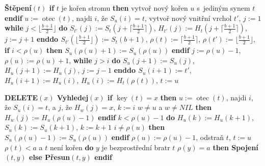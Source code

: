 \documentclass[a4paper,12pt]{article}
\DeclareMathOperator*{\otec}{otec}
\DeclareMathOperator*{\key}{key}
\begin{document}
{\bf Štěpení$(t)$\newline 
if} $t$ je kořen stromu {\bf then}\newline 
\phantom{---}vytvoř nový kořen $u$ s~jediným synem $t$\newline 
{\bf endif}\newline 
$u:=\otec(t)$, najdi $i$, že $S_u(i)=t$,\newline 
vytvoř nový vnitřní vrchol $t'$, $j:=1$\newline 
{\bf while} $j<\lfloor\frac {b+1}2\rfloor$ {\bf do}\newline 
\phantom{---}$S_{t'}(j):=S_t(j+\lceil\frac {b+1}2\rceil )$, $H_{t'}(j):=H_t(j+\lceil\frac {b+1}2\rceil)$, $j:=j+1$\newline 
{\bf enddo\newline 
$S_{t'}(\lfloor\frac {b+1}2\rfloor ):=S_t(b+1)$}, $\rho (t):=\lceil\frac {
b+1}2\rceil$, $\rho (t'):=\lfloor\frac {b+1}2\rfloor$,\newline 
{\bf if} $i<\rho (u)$ {\bf then} $S_u(\rho (u)+1):=S_u(\rho (u))$ {\bf endif\newline}
$j:=\rho (u)-1$, $\rho (u):=\rho (u)+1$,\newline 
{\bf while} $j>i$ {\bf do}\newline 
\phantom{---}$S_u(j+1):=S_u(j)$, $H_u(j+1):=H_u(j)$, $j:=j-1$\newline 
{\bf enddo\newline 
$S_u(i+1):=t'$}, $H_u(i+1):=H_u(i)$, $H_u(i):=H_t(\rho (t))$, 
$t:=u$

{\bf DELETE$(x)$\newline 
Vyhledej$(x)$\newline 
if} $\key(t)=x$ {\bf then}\newline 
\phantom{---}$u:=\otec(t)$, najdi $i$, že $S_u(i)=t$, a $j$, že $H_w(j)=x$, $k:=i$\newline 
\phantom{---}{\bf if} $w\ne u$ a $w\ne NIL$ {\bf then} $H_w(j):=H_u(\rho (u)-1)$ {\bf endif}\newline 
\phantom{---}{\bf while} $k<\rho (u)-1$ {\bf do}\newline 
\phantom{------}$H_u(k):=H_u(k+1)$, $S_u(k):=S_u(k+1)$, $k:=k+1$ \newline 
\phantom{---}{\bf enddo}\newline 
\phantom{---}{\bf if} $i\ne\rho(u)$ {\bf then} $S_u(\rho (u)-1):=S_u(\rho (u))$ {\bf endif}\newline
\phantom{---}$\rho (u):=\rho (u)-1$, odstraň $t$, $t:=u$ \newline 
\phantom{---}{\bf while} $\rho (t)<a$ a $t$ není kořen {\bf do}\newline 
\phantom{------}$y$ je bezprostřední bratr $t$\newline 
\phantom{------}{\bf if} $\rho (y)=a$ {\bf then Spojení$(t,y)$ else Přesun$
(t,y)$ endif}\newline 
\phantom{---}{\bf enddo\newline 
endif}
\end{document}
